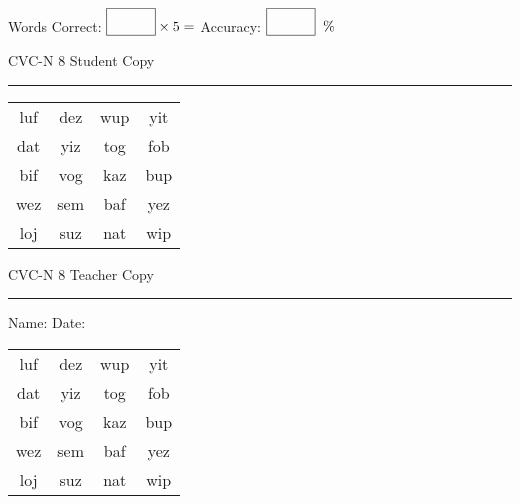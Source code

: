 \documentclass{memoir}
\begin{document}
\small

Words Correct: $\fbox{\phantom{\huge 100}} \times 5 = $ Accuracy: $\fbox{\phantom{\huge 100}}\;\; \%$ 

\vfill

\newpage


\footnotesize \noindent
CVC-N 8 \hfill Student Copy
\smallskip
\hrule

\Large

\setlength{\tabcolsep}{14pt}
\def\arraystretch{2}

{\selectfont


\begin{vplace}[0.5]
\begin{center}
\begin{tabular}{cccc}
luf & dez & wup & yit \\
dat & yiz & tog & fob \\
bif & vog & kaz & bup \\
wez & sem & baf & yez \\
loj & suz & nat & wip \\
\end{tabular}
\end{center}
\end{vplace}

}

\newpage

\footnotesize \noindent
CVC-N 8 \hfill Teacher Copy
\smallskip
\hrule

\small

\vfill

\noindent
Name: \underline{\hspace{1.75in}} \hfill Date: \underline{\hspace{1in}}

\Large

{\selectfont


\begin{vplace}[0.5]
\begin{center}
\begin{tabular}{cccc}
luf & dez & wup & yit \\
dat & yiz & tog & fob \\
bif & vog & kaz & bup \\
wez & sem & baf & yez \\
loj & suz & nat & wip \\
\end{tabular}
\end{center}
\end{vplace}



}
\end{document}
